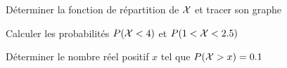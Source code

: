 \begin{exo}
	\begin{subexo}{Déterminer la fonction de répartition de $\mathcal{X}$ et tracer son graphe}
	\end{subexo}
	\begin{subexo}{Calculer les probabilités $P(\mathcal{X} < 4)$ et $P(1 < \mathcal{X} < 2.5)$}
	\end{subexo}
	\begin{subexo}{Déterminer le nombre réel positif $x$ tel que $P(\mathcal{X} > x) = 0.1$}
	\end{subexo}
\end{exo}
